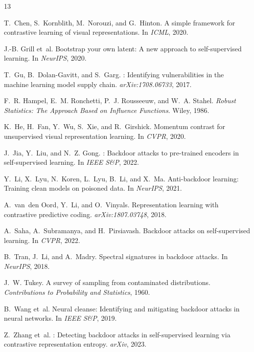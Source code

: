 \documentclass[11pt,a4paper]{article}
\begin{document}

\begin{thebibliography}{13}

T.~Chen, S.~Kornblith, M.~Norouzi, and G.~Hinton.
\newblock A simple framework for contrastive learning of visual representations.
\newblock In \emph{ICML}, 2020.

J.-B. Grill et~al.
\newblock Bootstrap your own latent: A new approach to self-supervised learning.
\newblock In \emph{NeurIPS}, 2020.

T.~Gu, B.~Dolan-Gavitt, and S.~Garg.
: Identifying vulnerabilities in the machine learning model
  supply chain.
\newblock \emph{arXiv:1708.06733}, 2017.

F.~R. Hampel, E.~M. Ronchetti, P.~J. Rousseeuw, and W.~A. Stahel.
\newblock \emph{Robust Statistics: The Approach Based on Influence Functions}.
\newblock Wiley, 1986.

K.~He, H.~Fan, Y.~Wu, S.~Xie, and R.~Girshick.
\newblock Momentum contrast for unsupervised visual representation learning.
\newblock In \emph{CVPR}, 2020.

J.~Jia, Y.~Liu, and N.~Z. Gong.
: Backdoor attacks to pre-trained encoders in
  self-supervised learning.
\newblock In \emph{IEEE S\&P}, 2022.

Y.~Li, X.~Lyu, N.~Koren, L.~Lyu, B.~Li, and X.~Ma.
\newblock Anti-backdoor learning: Training clean models on poisoned data.
\newblock In \emph{NeurIPS}, 2021.

A.~van~den Oord, Y.~Li, and O.~Vinyals.
\newblock Representation learning with contrastive predictive coding.
\newblock \emph{arXiv:1807.03748}, 2018.

A.~Saha, A.~Subramanya, and H.~Pirsiavash.
\newblock Backdoor attacks on self-supervised learning.
\newblock In \emph{CVPR}, 2022.

B.~Tran, J.~Li, and A.~Madry.
\newblock Spectral signatures in backdoor attacks.
\newblock In \emph{NeurIPS}, 2018.

J.~W. Tukey.
\newblock A survey of sampling from contaminated distributions.
\newblock \emph{Contributions to Probability and Statistics}, 1960.

B.~Wang et~al.
\newblock Neural cleanse: Identifying and mitigating backdoor attacks in neural
  networks.
\newblock In \emph{IEEE S\&P}, 2019.

Z.~Zhang et~al.
: Detecting backdoor attacks in self-supervised learning via
  contrastive representation entropy.
\newblock \emph{arXiv}, 2023.

\end{thebibliography}
\end{document}

